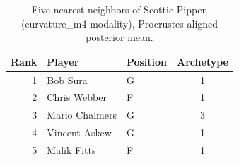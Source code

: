 \begin{table}[htbp]
  \centering\small
  \begin{tabular}{rllc}
    \toprule
    Rank & Player & Position & Archetype \\
    \midrule
    1 & Bob Sura & G & 1 \\
    2 & Chris Webber & F & 1 \\
    3 & Mario Chalmers & G & 3 \\
    4 & Vincent Askew & G & 1 \\
    5 & Malik Fitts & F & 1 \\
    \bottomrule
  \end{tabular}
  \caption{Five nearest neighbors of Scottie Pippen (curvature_m4 modality), Procrustes-aligned posterior mean.}
  \label{tab:Scottie_Pippen_neighbors_curvature_m4}
\end{table}

